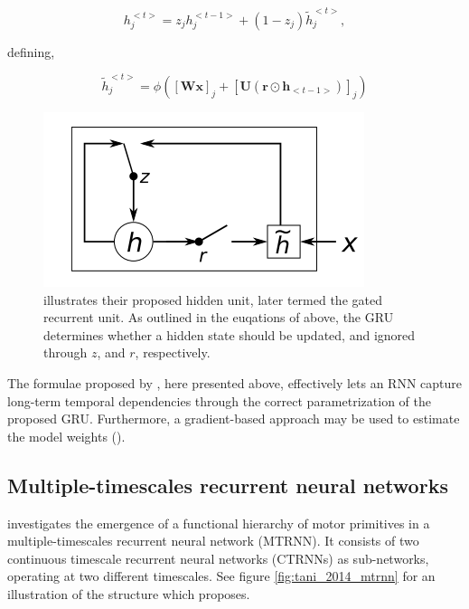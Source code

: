 \begin{equation}
    h_j^{<t>} = z_j h_j^{<t-1>} + (1 - z_j) \tilde{h}_j^{<t>},
\end{equation}
 
defining,
 
\begin{equation}
    \tilde{h}_j^{<t>} = \phi ([\textbf{W}\textbf{x}]_j + [\textbf{U}(\textbf{r} \odot \textbf{h}_{<t-1>})]_j)
\end{equation}

\begin{figure}
\centering
\includegraphics{fig/cho_gru}
\caption{\cite{Cho2014} illustrates their proposed hidden unit, later termed the gated recurrent unit. As outlined in the euqations of \cite{Cho2014} above, the GRU determines whether a hidden state should be updated, and ignored through $z$, and $r$, respectively.}
\label{fig:cho_gru}
\end{figure}

The formulae proposed by \cite{Cho2014}, here presented above, effectively lets an RNN capture long-term temporal dependencies through the correct parametrization of the proposed GRU. Furthermore, a gradient-based approach may be used to estimate the model weights (\cite{Cho2014}).


\subsection{Multiple-timescales recurrent neural networks}

\cite{Tani2014} investigates the emergence of a functional hierarchy of motor primitives in a multiple-timescales recurrent neural network (MTRNN). It consists of two continuous timescale recurrent neural networks (CTRNNs) as sub-networks, operating at two different timescales. See figure \ref{fig:tani_2014_mtrnn} for an illustration of the structure which \cite{Tani2014} proposes.

